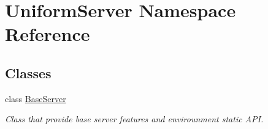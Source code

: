 \hypertarget{namespace_uniform_server}{}\section{Uniform\+Server Namespace Reference}
\label{namespace_uniform_server}
\subsection*{Classes}
\begin{DoxyCompactItemize}
\item 
class \mbox{\hyperlink{class_uniform_server_1_1_base_server}{Base\+Server}}
\begin{DoxyCompactList}\small\item\em Class that provide base server features and envirounment static A\+PI. \end{DoxyCompactList}\end{DoxyCompactItemize}
